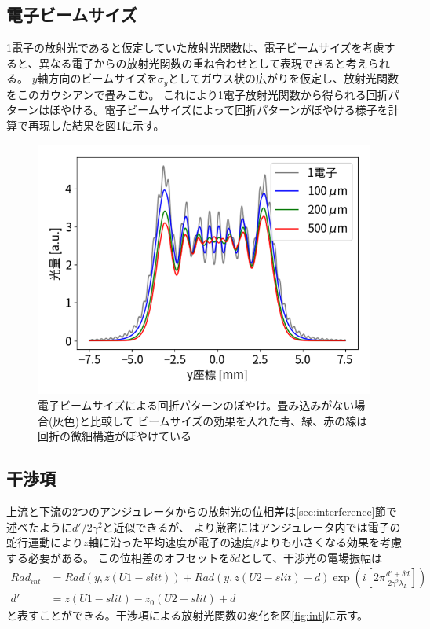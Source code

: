 \documentclass[a4paper,11pt,uplatex]{jsbook}
\begin{document}
\subsection{電子ビームサイズ}
1電子の放射光であると仮定していた放射光関数は、電子ビームサイズを考慮すると、異なる電子からの放射光関数の重ね合わせとして表現できると考えられる。
$y$軸方向のビームサイズを$\sigma_y$としてガウス状の広がりを仮定し、放射光関数をこのガウシアンで畳みこむ。
これにより1電子放射光関数から得られる回折パターンはぼやける。電子ビームサイズによって回折パターンがぼやける様子を計算で再現した結果を図\ref{beamsize}に示す。
\begin{figure}[h]
  \centering
  \includegraphics[width=0.8\linewidth]{image/4-esize.png}
  \caption[放射光関数の電子ビームサイズの効果]{電子ビームサイズによる回折パターンのぼやけ。畳み込みがない場合(灰色)と比較して
  ビームサイズの効果を入れた青、緑、赤の線は回折の微細構造がぼやけている}\label{beamsize}
\end{figure}

\subsection{干渉項}
上流と下流の2つのアンジュレータからの放射光の位相差は\ref{sec:interference}節で述べたように$d'/2\gamma^2$と近似できるが、
より厳密にはアンジュレータ内では電子の蛇行運動により$z$軸に沿った平均速度が電子の速度$\beta$よりも小さくなる効果を考慮する必要がある。
この位相差のオフセットを$\delta d$として、干渉光の電場振幅は
\begin{align}
  Rad_{int} &= Rad(y, z(U1-slit)) + Rad(y, z(U2-slit) -d )\exp(i \left[2\pi \frac{d' + \delta d}{2\gamma^2\lambda_L}\right])\\
  d' &= z(U1-slit) - z_0(U2-slit) + d
\end{align}
と表すことができる。干渉項による放射光関数の変化を図\ref{fig:int}に示す。
\end{document}
